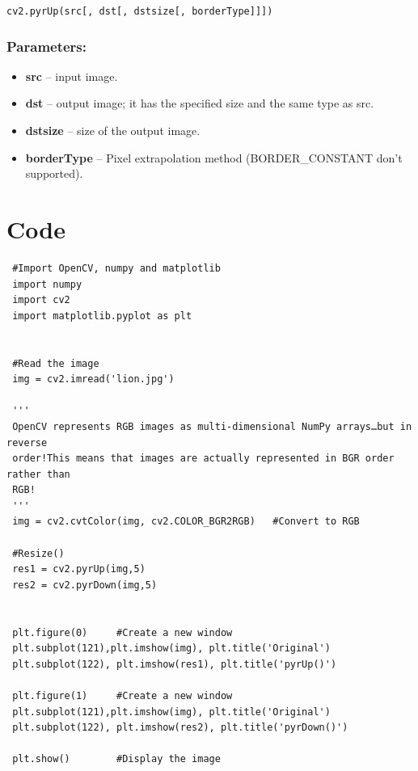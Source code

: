 \documentclass[]{article}
\providecommand{\tightlist}{%
  \setlength{\itemsep}{0pt}\setlength{\parskip}{0pt}}
\begin{document}
\texttt{cv2.pyrUp(src{[},\ dst{[},\ dstsize{[},\ borderType{]}{]}{]})}

\subsubsection{Parameters:}\label{parameters-1}

\begin{itemize}
\tightlist
\item
  \textbf{src} -- input image.
\item
  \textbf{dst} -- output image; it has the specified size and the same
  type as src.
\item
  \textbf{dstsize} -- size of the output image.
\item
  \textbf{borderType} -- Pixel extrapolation method (BORDER\_CONSTANT
  don't supported).
\end{itemize}

\section{Code}\label{code-1}

\begin{verbatim}
 #Import OpenCV, numpy and matplotlib
 import numpy
 import cv2
 import matplotlib.pyplot as plt


 #Read the image
 img = cv2.imread('lion.jpg')

 '''
 OpenCV represents RGB images as multi-dimensional NumPy arrays…but in reverse
 order!This means that images are actually represented in BGR order rather than
 RGB!
 '''
 img = cv2.cvtColor(img, cv2.COLOR_BGR2RGB)   #Convert to RGB

 #Resize()
 res1 = cv2.pyrUp(img,5)
 res2 = cv2.pyrDown(img,5)


 plt.figure(0)     #Create a new window
 plt.subplot(121),plt.imshow(img), plt.title('Original')
 plt.subplot(122), plt.imshow(res1), plt.title('pyrUp()')

 plt.figure(1)     #Create a new window
 plt.subplot(121),plt.imshow(img), plt.title('Original')
 plt.subplot(122), plt.imshow(res2), plt.title('pyrDown()')

 plt.show()        #Display the image
\end{verbatim}
\end{document}
